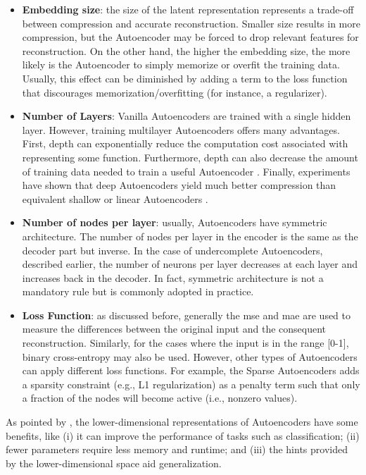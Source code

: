 \begin{itemize}
\item \textbf{Embedding size}: the size of the latent representation represents a trade-off between compression and accurate reconstruction. Smaller size results in more compression, but the Autoencoder may be forced to drop relevant features for reconstruction. On the other hand, the higher the embedding size, the more likely is the Autoencoder to simply memorize or overfit the training data. Usually, this effect can be diminished by adding a term to the loss function that discourages memorization/overfitting (for instance, a regularizer).

\item \textbf{Number of Layers}: Vanilla Autoencoders are trained with a single hidden layer. However, training multilayer Autoencoders offers many advantages. First, depth can exponentially reduce the computation cost associated with representing some function. Furthermore, depth can also decrease the amount of training data needed to train a useful Autoencoder \citep{lecun2015deep}. Finally, experiments have shown that deep Autoencoders yield much better compression than equivalent shallow or linear Autoencoders \citep{hinton2006reducing}.

\item \textbf{Number of nodes per layer}: usually, Autoencoders have symmetric architecture. The number of nodes per layer in the encoder is the same as the decoder part but inverse. In the case of undercomplete Autoencoders, described earlier, the number of neurons per layer decreases at each layer and increases back in the decoder. In fact, symmetric architecture is not a mandatory rule but is commonly adopted in practice.

\item \textbf{Loss Function}: as discussed before, generally the \acs{mse} and \acs{mae} are used to measure the differences between the original input and the consequent reconstruction. Similarly, for the cases where the input is in the range [0-1], binary cross-entropy may also be used. However, other types of Autoencoders can apply different loss functions. For example, the Sparse Autoencoders adds a sparsity constraint (e.g., L1 regularization) as a penalty term such that only a fraction of the nodes will become active (i.e., nonzero values).
\end{itemize}

As pointed by \cite{lecun2015deep}, the lower-dimensional representations of Autoencoders have some benefits, like (i) it can improve the performance of tasks such as classification; (ii) fewer parameters require less memory and runtime; and (iii) the hints provided by the lower-dimensional space aid generalization.

